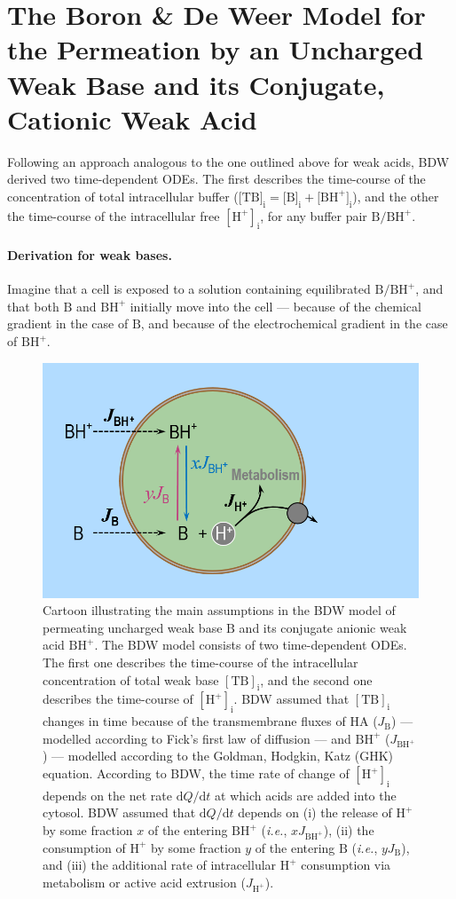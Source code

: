 \documentclass[fleqn,10pt]{physiome}
\begin{document}
\section{The Boron \& De Weer Model for the Permeation by an Uncharged Weak Base and its Conjugate, Cationic Weak Acid}

Following an approach analogous to the one outlined above for weak acids, BDW derived two time-dependent ODEs. The first describes the time-course of the concentration of total intracellular buffer ($[\mathrm{TB]_i} = [\mathrm{B]_i}+[\mathrm{BH^+]_i}$), and the other the time-course of the intracellular free $\mathrm{[H^+]_i}$, for any buffer pair $\mathrm{B}/\mathrm{BH^+}$.

\paragraph{Derivation for weak bases.}

Imagine that a cell is exposed to a solution containing equilibrated $\mathrm{B}/\mathrm{BH^+}$, and that both $\mathrm{B}$ and $\mathrm{BH^+}$ initially move into the cell --- because of the chemical gradient in the case of $\mathrm{B}$, and because of the electrochemical gradient in the case of $\mathrm{BH^+}$.

\begin{figure}[ht]
\centering
\includegraphics[width=0.5\linewidth]{img/Figure 5.png}
\caption{\label{fig:5} Cartoon illustrating the main assumptions in the BDW model of permeating uncharged weak base $\mathrm{B}$ and its conjugate anionic weak acid $\mathrm{BH^+}$. The BDW model consists of two time-dependent ODEs. The first one describes the time-course of the intracellular concentration of total weak base $\mathrm{[TB]_i}$, and the second one describes the time-course of $\mathrm{[H^+]_i}$. BDW assumed that $\mathrm{[TB]_i}$ changes in time because of the transmembrane fluxes of $\mathrm{HA}$ ($J_\mathrm{B}$) --- modelled according to Fick's first law of diffusion --- and $\mathrm{BH^+}$ ($J_\mathrm{BH^+}$) --- modelled according to the Goldman, Hodgkin, Katz (GHK) equation. According to BDW, the time rate of change of $\mathrm{[H^+]_i}$ depends on the net rate $\mathrm{d}Q/\mathrm{d}t$ at which acids are added into the cytosol. BDW assumed that $\mathrm{d}Q/\mathrm{d}t$ depends on (i) the release of $\mathrm{H^+}$ by some fraction $x$ of the entering $\mathrm{BH^+}$ (\emph{i.e.}, $xJ_\mathrm{BH^+}$), (ii) the consumption of $\mathrm{H^+}$ by some fraction $y$ of the entering $\mathrm{B}$ (\emph{i.e.}, $yJ_\mathrm{B}$), and (iii) the additional rate of intracellular $\mathrm{H^+}$ consumption via metabolism or active acid extrusion ($J_\mathrm{H^+}$).}
\end{figure}
\end{document}
